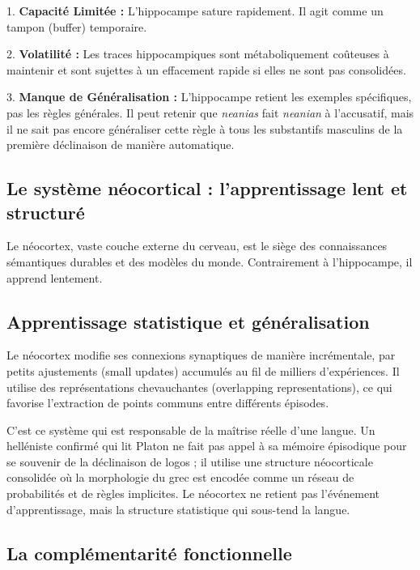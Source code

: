 1. \textbf{Capacité Limitée :} L'hippocampe sature rapidement. Il agit comme un tampon (buffer)
temporaire.

2. \textbf{Volatilité :} Les traces hippocampiques sont métaboliquement coûteuses à maintenir et
sont sujettes à un effacement rapide si elles ne sont pas consolidées.

3. \textbf{Manque de Généralisation :} L'hippocampe retient les exemples spécifiques, pas les règles
générales. Il peut retenir que \textit{neanias} fait \textit{neanian} à l'accusatif, mais il ne \og
sait\fg{} pas encore généraliser cette règle à tous les substantifs masculins de la première
déclinaison de manière automatique.



\subsection{Le système néocortical : l'apprentissage lent et structuré}

Le néocortex, vaste couche externe du cerveau, est le siège des connaissances sémantiques durables
et des modèles du monde. Contrairement à l'hippocampe, il apprend lentement.



\subsection{Apprentissage statistique et généralisation}

Le néocortex modifie ses connexions synaptiques de manière incrémentale, par petits ajustements
(small updates) accumulés au fil de milliers d'expériences.\cite{III-3-1-ref3} Il utilise des
représentations chevauchantes (overlapping representations), ce qui favorise l'extraction de points
communs entre différents épisodes.

C'est ce système qui est responsable de la maîtrise réelle d'une langue. Un helléniste confirmé qui
lit Platon ne fait pas appel à sa mémoire épisodique pour se souvenir de la déclinaison de logos ;
il utilise une structure néocorticale consolidée où la morphologie du grec est encodée comme un
réseau de probabilités et de règles implicites. Le néocortex ne retient pas l'événement
d'apprentissage, mais la structure statistique qui sous-tend la langue.\cite{III-3-1-ref5}



\subsection{La complémentarité fonctionnelle}

